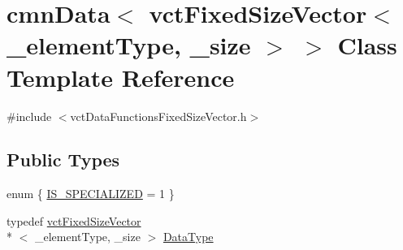 \hypertarget{classcmn_data_3_01vct_fixed_size_vector_3_01__element_type_00_01__size_01_4_01_4}{\section{cmn\-Data$<$ vct\-Fixed\-Size\-Vector$<$ \-\_\-element\-Type, \-\_\-size $>$ $>$ Class Template Reference}
\label{classcmn_data_3_01vct_fixed_size_vector_3_01__element_type_00_01__size_01_4_01_4}
}


{\ttfamily \#include $<$vct\-Data\-Functions\-Fixed\-Size\-Vector.\-h$>$}

\subsection*{Public Types}
\begin{DoxyCompactItemize}
\item 
enum \{ \hyperlink{classcmn_data_3_01vct_fixed_size_vector_3_01__element_type_00_01__size_01_4_01_4_a3cc02489a14a62b167209c4161b694a5aa91408e94959b83b507757e31a2b1958}{I\-S\-\_\-\-S\-P\-E\-C\-I\-A\-L\-I\-Z\-E\-D} = 1
 \}
\item 
typedef \hyperlink{classvct_fixed_size_vector}{vct\-Fixed\-Size\-Vector}\\*
$<$ \-\_\-element\-Type, \-\_\-size $>$ \hyperlink{classcmn_data_3_01vct_fixed_size_vector_3_01__element_type_00_01__size_01_4_01_4_ac8ff1c45828cc2add8111e02980f183a}{Data\-Type}
\end{DoxyCompactItemize}

